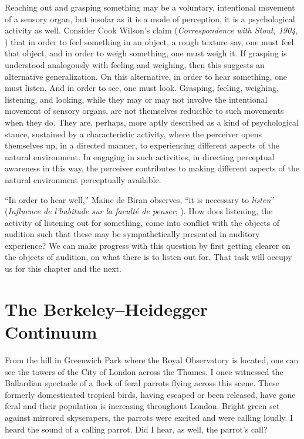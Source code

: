 Reaching out and grasping something may be a voluntary, intentional movement of a sensory organ, but insofar as it is a mode of perception, it is a psychological activity as well. Consider Cook Wilson's claim (\emph{Correspondence with Stout, 1904}, \citeyear{Cook-Wilson:1926sf}) that in order to feel something in an object, a rough texture say, one must feel that object, and in order to weigh something, one must weigh it. If grasping is understood analogously with feeling and weighing, then this suggests an alternative generalization. On this alternative, in order to hear something, one must listen. And in order to see, one must look. Grasping, feeling, weighing, listening, and looking, while they may or may not involve the intentional movement of sensory organs, are not themselves reducible to such movements when they do. They are, perhaps, more aptly described as a kind of psychological stance, sustained by a characteristic activity, where the perceiver opens themselves up, in a directed manner, to experiencing different aspects of the natural environment. In engaging in such activities, in directing perceptual awareness in this way, the perceiver contributes to making different aspects of the natural environment perceptually available.

``In order to hear well,'' Maine de Biran observes, ``it is necessary to \emph{listen}'' (\emph{Influence de l'habitude sur la faculté de penser}; \citealt[63--4]{Boehm:1929aa}). How does listening, the activity of listening out for something, come into conflict with the objects of audition such that these may be sympathetically presented in auditory experience? We can make progress with this question by first getting clearer on the objects of audition, on what there is to listen out for. That task will occupy us for this chapter and the next.


\section{The Berkeley--Heidegger Continuum} %
\label{sec:the_berkeley_heidegger_continuum}

From the hill in Greenwich Park where the Royal Observatory is located, one can see the towers of the City of London across the Thames. I once witnessed the Ballardian spectacle of a flock of feral parrots flying across this scene. These formerly domesticated tropical birds, having escaped or been released, have gone feral and their population is increasing throughout London. Bright green set against mirrored skyscrapers, the parrots were excited and were calling loudly. I heard the sound of a calling parrot. Did I hear, as well, the parrot's call?

